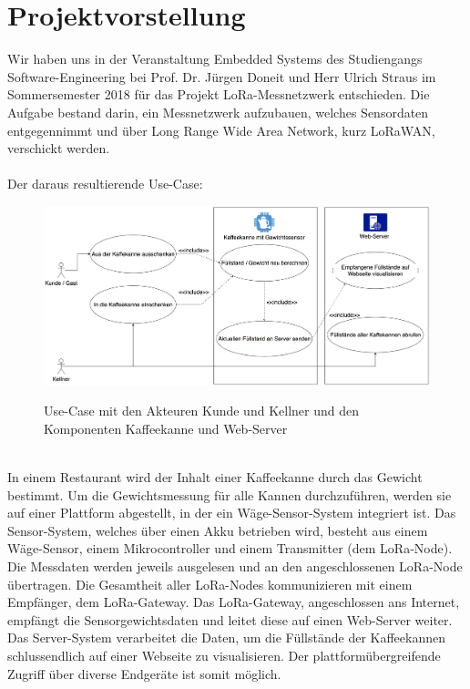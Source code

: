 




\chapter{Projektvorstellung}
Wir haben uns in der Veranstaltung Embedded Systems des Studiengangs Software-Engineering bei Prof. Dr. Jürgen Doneit und Herr Ulrich Straus im Sommersemester 2018 für das Projekt LoRa-Messnetzwerk entschieden. Die Aufgabe bestand darin, ein Messnetzwerk aufzubauen, welches Sensordaten entgegennimmt und über Long Range Wide Area Network, kurz LoRaWAN, verschickt werden.\\
\\
Der daraus resultierende Use-Case:
\begin{figure}[ht]
    \center
    \includegraphics[width=15cm]{Bilder/usecase-1.png}\\
    \caption{Use-Case mit den Akteuren Kunde und Kellner und den Komponenten Kaffeekanne und Web-Server}
    \label{fig:Use-Case}
\end{figure}
\\
In einem Restaurant wird der Inhalt einer Kaffeekanne durch das Gewicht bestimmt. Um die Gewichtsmessung für alle Kannen durchzuführen, werden sie auf einer Plattform abgestellt, in der ein Wäge-Sensor-System integriert ist. Das Sensor-System, welches über einen Akku betrieben wird, besteht aus einem Wäge-Sensor, einem Mikrocontroller und einem Transmitter (dem LoRa-Node). Die Messdaten werden jeweils ausgelesen und an den angeschlossenen LoRa-Node übertragen. Die Gesamtheit aller LoRa-Nodes kommunizieren mit einem Empfänger, dem LoRa-Gateway. Das LoRa-Gateway, angeschlossen ans Internet, empfängt die Sensorgewichtsdaten und leitet diese auf einen Web-Server weiter. Das Server-System verarbeitet die Daten, um die Füllstände der Kaffeekannen schlussendlich auf einer Webseite zu visualisieren. Der plattformübergreifende Zugriff über diverse Endgeräte ist somit möglich.

